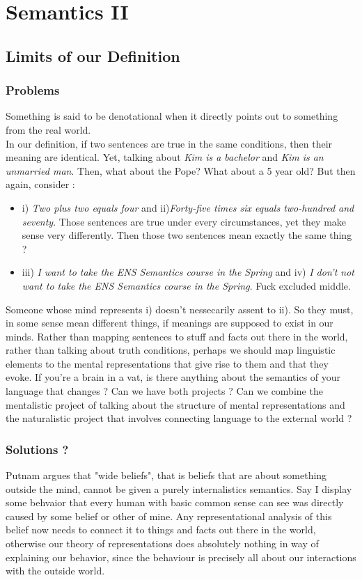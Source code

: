 \documentclass{cours}
\begin{document}
\section[Class 6\! : 16/11]{Semantics II}
\subsection{Limits of our Definition}
\subsubsection{Problems}
Something is said to be denotational when it directly points out to something from the real world. \\

In our definition, if two sentences are true in the same conditions, then their meaning are identical.
Yet, talking about \textsl{Kim is a bachelor} and \textsl{Kim is an unmarried man}. Then, what about the Pope? What about a 5 year old?
But then again, consider\! : 
\begin{itemize}
    \item i) \textsl{Two plus two equals four} and ii)\textsl{Forty-five times six equals two-hundred and seventy}. Those sentences are true under every circumstances, yet they make sense very differently. Then those two sentences mean exactly the same thing ? 
    \item iii) \textsl{I want to take the ENS Semantics course in the Spring} and iv) \textsl{I don't not want to take the ENS Semantics course in the Spring}. Fuck excluded middle.
\end{itemize}
Someone whose mind represents i) doesn't nessecarily assent to ii). So they must, in some sense mean different things, if meanings are supposed to exist in our minds. Rather than mapping sentences to stuff and facts out there in the world, rather than talking about truth conditions, perhaps we should map linguistic elements to the mental representations that give rise to them and that they evoke. If you're a brain in a vat, is there anything about the semantics of your language that changes ? Can we have both projects ? Can we combine the mentalistic project of talking about the structure of mental representations and the naturalistic project that involves connecting language to the external world ? 

\subsubsection{Solutions ?}
Putnam argues that "wide beliefs", that is beliefs that are about something outside the mind, cannot be given a purely internalistics semantics. Say I display some behvaior that every human with basic common sense can see was directly caused by some belief or other of mine. Any representational analysis of this belief now needs to connect it to things and facts out there in the world, otherwise our theory of representations does absolutely nothing in way of explaining our behavior, since the behaviour is precisely all about our interactions with the outside world.\\
\end{document}

